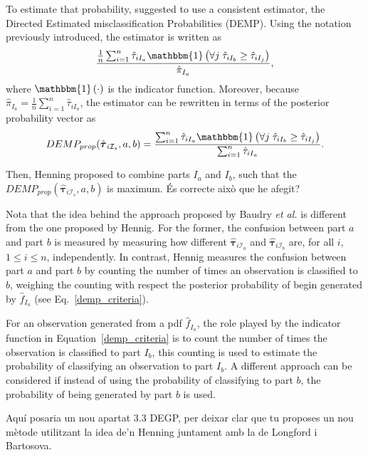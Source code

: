 \documentclass[10pt, a4paper]{article}
\newcommand{\m}[1]{\boldsymbol{#1}}
\begin{document}
To estimate that probability,  \cite{hennig2010methods} suggested to use a consistent estimator, the Directed Estimated misclassification Probabilities (DEMP). Using the notation previously introduced, the estimator is written as
\[
\frac{ \frac{1}{n} \sum_{i=1}^n {\hat{\tau}_{iI_a} \mathbbm{1}\left( \forall j\; \hat{\tau}_{i I_{b}} \geq \hat{\tau}_{iI_j} \right)}}{ \hat{\pi}_{I_a}},
\]
where $\mathbbm{1}\left( \cdot \right)$ is the indicator function. Moreover, because $ \hat{\pi}_{I_a} = \frac{1}{n} \sum_{i=1}^n \hat{\tau}_{iI_a}$, the estimator can be rewritten in terms of the posterior probability vector as
\begin{equation}\label{demp_criteria}
DEMP_{prop}(\hat{\m \tau}_{i \mathcal{I}_s}, a, b) =\frac{ \sum_{i=1}^n {\hat{\tau}_{iI_a} \mathbbm{1}\left( \forall j\; \hat{\tau}_{i I_{b}} \geq \hat{\tau}_{iI_j} \right)}}{\sum_{i=1}^n \hat{\tau}_{iI_a} }.
\end{equation}

Then, Henning proposed to combine parts $I_a$ and $I_b$, such that the $DEMP_{prop}(\hat{\m \tau}_{i \mathcal{I}_s}, a, b)$ is maximum. {\color{blue} \'{E}s correcte aix\`{o} que he afegit?} 

Nota that the idea behind the approach proposed by Baudry \emph{et al.} is different from the one proposed by Hennig. For the former, the confusion between part $a$ and part $b$ is measured by measuring how different $\hat{\m \tau}_{i \mathcal{I}_a}$ and $\hat{\m \tau}_{i \mathcal{I}_b}$ are, for all $i$, $1\leq i \leq n$, independently. In contrast, Hennig measures the confusion between part $a$ and part $b$ by counting the number of times an observation is classified to $b$, weighing the counting with respect the posterior probability of begin generated by $\hat{f}_{I_a}$ (see Eq.~\ref{demp_criteria}).

For an observation generated from a pdf $\hat{f}_{I_a}$, the role played by the indicator function in Equation~\ref{demp_criteria} is to count the number of times the observation is classified to part $I_b$, this counting is used to estimate the probability of classifying an observation to part $I_b$. A different approach can be considered if instead of using the probability of classifying to part $b$, the probability of being generated by part $b$ is used.

{\color{blue} Aquí posaria un nou apartat 3.3 DEGP, per deixar clar que tu proposes un nou m\`{e}tode utilitzant la idea de'n Henning juntament amb la de Longford i Bartosova.}
\end{document}
